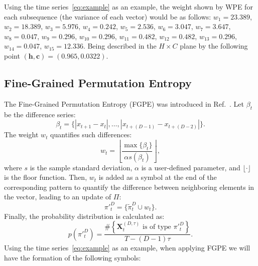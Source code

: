 Using the time series~\ref{eq:example} as an example, the weight shown by WPE for each subsequence (the variance of each vector) would be as follows:
$w_1 = 23.389$, 
$w_2 = 18.389$,
$w_3 = 5.976$,
$w_4 = 0.242$,
$w_5 = 2.536$,
$w_6 = 3.047$,
$w_7 = 3.647$,
$w_8 = 0.047$,
$w_9 = 0.296$,
$w_{10} = 0.296$,
$w_{11} = 0.482$,
$w_{12} = 0.482$,
$w_{13} = 0.296$,
$w_{14} = 0.047$,
$w_{15} = 12.336$.
Being described in the $H \times C$ plane by the following point
$(\bm h, \bm c) = (0.965, 0.0322)$.

\subsection{Fine-Grained Permutation Entropy}\label{FGPE}

The Fine-Grained Permutation Entropy (FGPE) was introduced in Ref.~\cite{xiao2009fine}.
Let $\beta_t$ be the difference series:
\begin{equation}
\beta_t = \big\{|x_{t+1} - x_t|, \dots, |x_{t+(D-1)} - x_{t+(D-2)}|\big\}.
\end{equation}
The weight $w_t$ quantifies such differences:
\begin{equation}
w_t = \left \lfloor \frac{\max\{\beta_t\}}{\alpha s(\beta_t) } \right \rfloor,
\end{equation}
where $s$ is the sample standard deviation,
$\alpha$ is a user-defined parameter, 
and $\lfloor\cdot \rfloor$ is the floor function.
Then, $w_t$ is added as a symbol at the end of the corresponding pattern to quantify the difference between neighboring elements in the vector, leading to an update of $\Pi$:
\begin{equation}
\pi{'}_t^D = \{ \widetilde \pi_t^D \cup w_t\}.
\end{equation} 
Finally, the probability distribution is calculated as:
\begin{equation}
p(\pi{'}_t^D) = \frac{\#\left \{\mathbf{X}_t^{(D,\tau)} \text{ is of type } \pi{'}_t^D\right \}}{T- (D-1)\tau}.
\end{equation}
Using the time series~\ref{eq:example} as an example, when applying FGPE we will have the formation of the following symbols:

